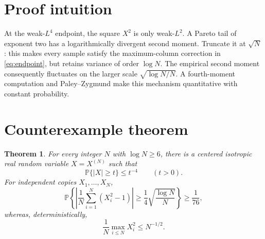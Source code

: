 \documentclass[11pt]{article}
\newtheorem{theorem}{Theorem}
\newcommand{\Pp}{\mathbb{P}}
\begin{document}
\section{Proof intuition}

At the weak-$L^4$ endpoint, the square $X^2$ is only weak-$L^2$.
A Pareto tail of exponent two has a logarithmically divergent second moment.
Truncate it at $\sqrt N$: this makes every sample satisfy the maximum-column
correction in \eqref{eq:endpoint}, but retains variance of order $\log N$.
The empirical second moment consequently fluctuates on the larger scale
$\sqrt{\log N/N}$.  A fourth-moment computation and Paley--Zygmund make this
mechanism quantitative with constant probability.

\section{Counterexample theorem}

\begin{theorem}\label{thm:main}
For every integer $N$ with $\log N\ge6$, there is a centered isotropic real
random variable $X=X^{(N)}$ such that
\[
 \Pp\{|X|\ge t\}\le t^{-4}\qquad(t>0).
\]
For independent copies $X_1,\dots,X_N$,
\[
 \Pp\left\{
 \left|\frac1N\sum_{i=1}^N(X_i^2-1)\right|
 \ge \frac14\sqrt{\frac{\log N}{N}}
 \right\}\ge\frac1{76},
\]
whereas, deterministically,
\[
 \frac1N\max_{i\le N}X_i^2\le N^{-1/2}.
\]
\end{theorem}
\end{document}
